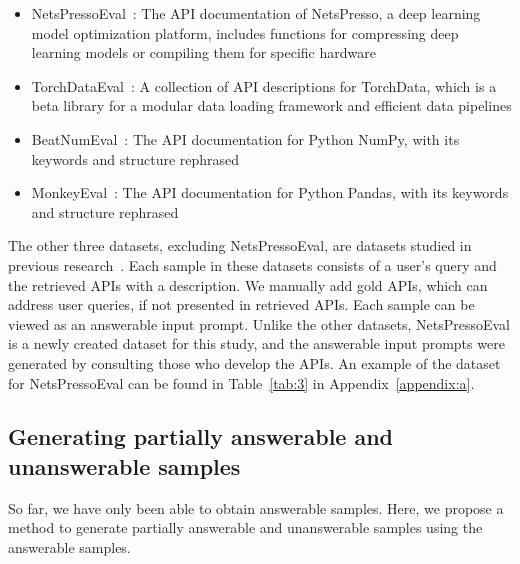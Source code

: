 \begin{itemize}
  \item NetsPressoEval~\cite{netspresso2024}: The API documentation of NetsPresso, a deep learning model optimization platform, includes functions for compressing deep learning models or compiling them for specific hardware
  \item TorchDataEval~\cite{zan-etal-2022-language}: A collection of API descriptions for TorchData, which is a beta library for a modular data loading framework and efficient data pipelines
  \item BeatNumEval~\cite{zan-etal-2022-language}: The API documentation for Python NumPy, with its keywords and structure rephrased
  \item MonkeyEval~\cite{zan-etal-2022-language}: The API documentation for Python Pandas, with its keywords and structure rephrased
\end{itemize}
The other three datasets, excluding NetsPressoEval, are datasets studied in previous research~\cite{zan-etal-2022-language, zan2023privatelibrary}. Each sample in these datasets consists of a user's query and the retrieved APIs with a description. We manually add gold APIs, which can address user queries, if not presented in retrieved APIs. Each sample can be viewed as an answerable input prompt. Unlike the other datasets, NetsPressoEval is a newly created dataset for this study, and the answerable input prompts were generated by consulting those who develop the APIs. An example of the dataset for NetsPressoEval can be found in Table~\ref{tab:3} in Appendix~\ref{appendix:a}. 

\subsection{Generating partially answerable and unanswerable samples}
\label{sec:2_3}

So far, we have only been able to obtain answerable samples. Here, we propose a method to generate partially answerable and unanswerable samples using the answerable samples.

